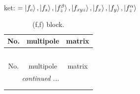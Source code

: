 \documentclass[fleqn,8pt,landscape]{jsarticle}
\begin{document}
\noindent
ket: $=\ket{f_{c}}, \ket{f_{s}}, \ket{f_{z}^{\beta}}, \ket{f_{xyz}}, \ket{f_{x}}, \ket{f_{y}}, \ket{f_{z}^{\alpha}}$
\renewcommand{\arraystretch}{1.6}
\begin{longtable}{ccc}
\caption{(f,f) block.}
 \\
 \hline \hline
No. & multipole & matrix \\ \hline \endfirsthead

\multicolumn{2}{l}{\tablename\ \thetable{}} \\
 \hline \hline
No. & multipole & matrix \\ \hline \endhead

 \hline \hline
\multicolumn{2}{r}{\footnotesize\it continued ...} \\ \endfoot

 \hline \hline
\multicolumn{2}{r}{} \\ \endlastfoot


\end{longtable}
\end{document}
